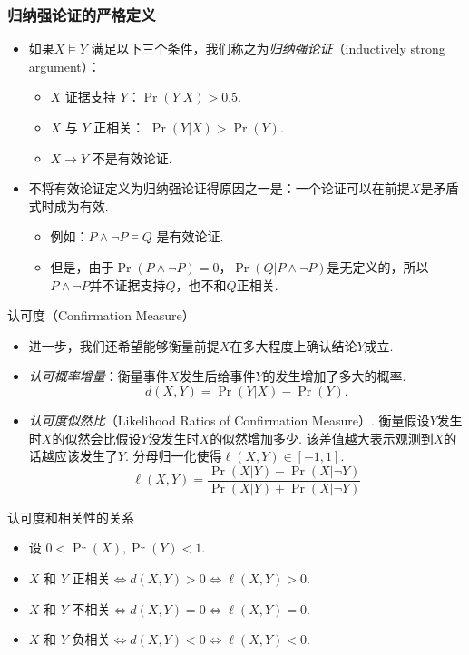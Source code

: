 \begin{frame}
	\frametitle{归纳强论证的严格定义}
	\begin{itemize}
	    \item 如果$X \models Y$ 满足以下三个条件，我们称之为\emph{归纳强论证}（inductively strong argument）：
	\begin{itemize}
	\item $X$ 证据支持 $Y$：$\Pr(Y|X)>0.5$.
	\item $X$ 与 $Y$ 正相关： $\Pr(Y|X) > \Pr(Y)$. 
	\item $X\rightarrow Y$ 不是有效论证.
	\end{itemize}
	 \item 不将有效论证定义为归纳强论证得原因之一是：一个论证可以在前提$X$是矛盾式时成为有效.
    \begin{itemize}
            \item 例如：$P \wedge \neg P \models Q$ 是有效论证.
            \item 但是，由于$\Pr(P \wedge \neg P) = 0$，$\Pr(Q | P \wedge \neg P)$是无定义的，所以$P \wedge \neg P$并不证据支持$Q$，也不和$Q$正相关.
        \end{itemize}	

	\end{itemize}
\end{frame}

\begin{frame}{认可度（Confirmation Measure）}
    \begin{itemize}
    \item     进一步，我们还希望能够衡量前提$X$在多大程度上确认结论$Y$成立.
    \item \emph{认可概率增量}：衡量事件$X$发生后给事件$Y$的发生增加了多大的概率.
        \[
            d(X, Y) = \Pr(Y|X) - \Pr(Y).
        \]
        \item \emph{认可度似然比}（Likelihood Ratios of Confirmation Measure）.
        衡量假设$Y$发生时$X$的似然会比假设$Y$没发生时$X$的似然增加多少.
        该差值越大表示观测到$X$的话越应该发生了$Y$. 分母归一化使得$\ell(X,Y)\in[-1,1]$.
        \[
            \ell(X, Y) = \frac{\Pr(X|Y) - \Pr(X|\lnot Y)}{\Pr(X|Y) + \Pr(X|\lnot Y)}
        \]
    \end{itemize} 
\end{frame}

\begin{frame}{认可度和相关性的关系}
\begin{itemize}
    \item 设 $0< \Pr(X),\Pr(Y) < 1$.
    \item $X$ 和 $Y$ 正相关$\iff d(X,Y) > 0\iff \ell(X, Y) > 0$.
    \item $X$ 和 $Y$ 不相关$\iff d(X, Y) = 0\iff \ell(X, Y) = 0$. 
    \item $X$ 和 $Y$ 负相关$\iff d(X,Y) < 0\iff\ell(X, Y) < 0$.
\end{itemize}
\end{frame}

